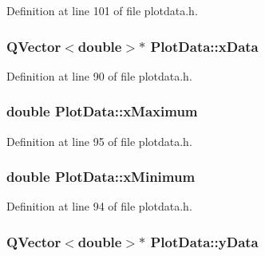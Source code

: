 \-Definition at line 101 of file plotdata.\-h.

\hypertarget{group___scope_plugin_ga6232b3f635142b1b11f283491a01b719}{
\subsubsection[{x\-Data}]{\setlength{\rightskip}{0pt plus 5cm}\-Q\-Vector$<$double$>$$\ast$ {\bf \-Plot\-Data\-::x\-Data}}}\label{group___scope_plugin_ga6232b3f635142b1b11f283491a01b719}


\-Definition at line 90 of file plotdata.\-h.

\hypertarget{group___scope_plugin_ga8d380f3d20ca5102bd641b5475238da6}{
\subsubsection[{x\-Maximum}]{\setlength{\rightskip}{0pt plus 5cm}double {\bf \-Plot\-Data\-::x\-Maximum}}}\label{group___scope_plugin_ga8d380f3d20ca5102bd641b5475238da6}


\-Definition at line 95 of file plotdata.\-h.

\hypertarget{group___scope_plugin_ga2115389376ac088ccc03fcb8a2279f8a}{
\subsubsection[{x\-Minimum}]{\setlength{\rightskip}{0pt plus 5cm}double {\bf \-Plot\-Data\-::x\-Minimum}}}\label{group___scope_plugin_ga2115389376ac088ccc03fcb8a2279f8a}


\-Definition at line 94 of file plotdata.\-h.

\hypertarget{group___scope_plugin_ga0544d6bcbe24fc0bb460123547821457}{
\subsubsection[{y\-Data}]{\setlength{\rightskip}{0pt plus 5cm}\-Q\-Vector$<$double$>$$\ast$ {\bf \-Plot\-Data\-::y\-Data}}}\label{group___scope_plugin_ga0544d6bcbe24fc0bb460123547821457}


